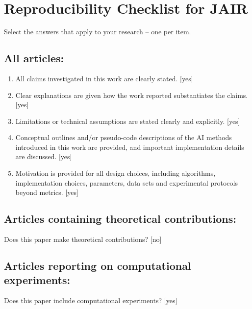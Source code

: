 \section{Reproducibility Checklist for JAIR}

Select the answers that apply to your research -- one per item.

\subsection*{All articles:}

\begin{enumerate}
    \item All claims investigated in this work are clearly stated.
    [yes]
    \item Clear explanations are given how the work reported substantiates the claims.
    [yes]
    \item Limitations or technical assumptions are stated clearly and explicitly.
    [yes]
    \item Conceptual outlines and/or pseudo-code descriptions of the AI methods introduced in this work are provided, and important implementation details are discussed.
    [yes]
    \item
    Motivation is provided for all design choices, including algorithms, implementation choices, parameters, data sets and experimental protocols beyond metrics.
    [yes]
\end{enumerate}

\subsection*{Articles containing theoretical contributions:}
Does this paper make theoretical contributions?
[no]

\subsection*{Articles reporting on computational experiments:}
Does this paper include computational experiments? [yes]

